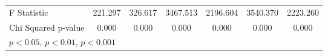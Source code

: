 \begin{table}[htbp]
\begin{tabular}{l*{6}{c}}
F Statistic         &     221.297         &     326.617         &    3467.513         &    2196.604         &    3540.370         &    2223.260         \\
Chi Squared p-value &       0.000         &       0.000         &       0.000         &       0.000         &       0.000         &       0.000         \\
\hline\hline
\multicolumn{7}{l}{\footnotesize \sym{*} \(p<0.05\), \sym{**} \(p<0.01\), \sym{***} \(p<0.001\)}\\
\end{tabular}
\end{table}
